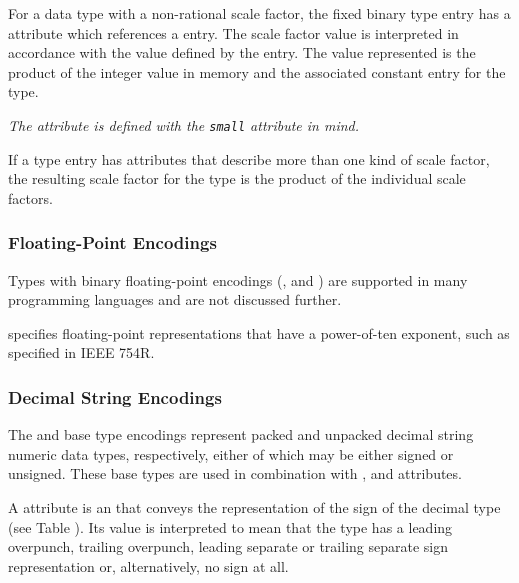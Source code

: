 {
For\hypertarget{chap:DWATsmallscalefactorforfixedpointtype}{}
a data type with a
\bb
non-rational
\eb
scale factor,
the fixed binary type entry has a \DWATsmallDEFN{} attribute which
 references a 
\DWTAGconstant{} entry. The scale factor value
is interpreted in accordance with the value defined by the
\DWTAGconstant{} entry. The value represented is the product
of the integer value in memory and the associated constant
entry for the type.

\textit{The \DWATsmall{} attribute is defined with the 
 \texttt{small} attribute in mind.}

\bb
If a type entry has attributes that describe more than one kind of scale
factor, 
the resulting scale factor for the type is the product of the
individual scale factors.
\eb

\subsubsection{Floating-Point Encodings}
\label{chap:floatingpointencodings}
Types with binary floating-point encodings 
(\DWATEfloat{}, \DWATEcomplexfloat{} and \DWATEimaginaryfloat{})
are supported in many
programming languages and are not discussed further.

\DWATEdecimalfloat{} specifies 
floating-point representations that have a power-of-ten
exponent, such as specified in IEEE 754R.

\subsubsection{Decimal String Encodings}
\label{chap:decimalstringencodings}
The \DWATEpackeddecimalDEFN{} and \DWATEnumericstringDEFN{} 
base type encodings
represent packed and unpacked decimal string numeric data
types, respectively, either of which may be either 
signed
or 
unsigned. These 
base types are used in combination with
\DWATdecimalsign, 
\DWATdigitcount{} and 
\DWATdecimalscale{}
attributes.

A\hypertarget{chap:DWATdecimalsigndecimalsignrepresentation}{}
\DWATdecimalsignDEFN{} attribute 
is an  that
conveys the representation of the sign of the decimal type
(see Table ). 
Its  value is interpreted to
mean that the type has a leading overpunch, trailing overpunch,
leading separate or trailing separate sign representation or,
alternatively, no sign at all.

}
